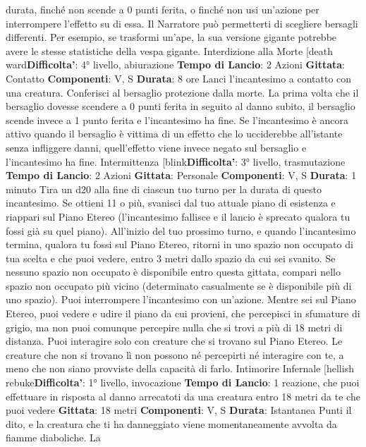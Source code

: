 \begin{multicols}{2}
durata, finché non scende a 0 punti ferita, o finché non
usi un’azione per interrompere l’effetto su di essa.
Il Narratore può permetterti di scegliere bersagli differenti. Per
esempio, se trasformi un’ape, la sua versione gigante
potrebbe avere le stesse statistiche della vespa
gigante.
Interdizione alla Morte
[death ward\textbf{Difficolta'}:
4° livello, abiurazione
\textbf{Tempo di Lancio}: 2 Azioni
\textbf{Gittata}: Contatto
\textbf{Componenti}: V, S
\textbf{Durata}: 8 ore
Lanci l’incantesimo a contatto con una creatura.
Conferisci al bersaglio protezione dalla morte.
La prima volta che il bersaglio dovesse scendere a 0
punti ferita in seguito al danno subito, il bersaglio
scende invece a 1 punto ferita e l’incantesimo ha fine.
Se l’incantesimo è ancora attivo quando il bersaglio è
vittima di un effetto che lo ucciderebbe all’istante senza
infliggere danni, quell’effetto viene invece negato sul
bersaglio e l’incantesimo ha fine.
Intermittenza
[blink\textbf{Difficolta'}:
3° livello, trasmutazione
\textbf{Tempo di Lancio}: 2 Azioni
\textbf{Gittata}: Personale
\textbf{Componenti}: V, S
\textbf{Durata}: 1 minuto
Tira un d20 alla fine di ciascun tuo turno per la durata di
questo incantesimo. Se ottieni 11 o più, svanisci dal tuo
attuale piano di esistenza e riappari sul Piano Etereo
(l’incantesimo fallisce e il lancio è sprecato qualora tu
fossi già su quel piano). All’inizio del tuo prossimo
turno, e quando l’incantesimo termina, qualora tu fossi
sul Piano Etereo, ritorni in uno spazio non occupato di
tua scelta e che puoi vedere, entro 3 metri dallo spazio
da cui sei svanito. Se nessuno spazio non occupato è
disponibile entro questa gittata, compari nello spazio
non occupato più vicino (determinato casualmente se è
disponibile più di uno spazio). Puoi interrompere
l’incantesimo con un’azione.
Mentre sei sul Piano Etereo, puoi vedere e udire il
piano da cui provieni, che percepisci in sfumature di
grigio, ma non puoi comunque percepire nulla che si
trovi a più di 18 metri di distanza. Puoi interagire solo
con creature che si trovano sul Piano Etereo. Le
creature che non si trovano lì non possono né percepirti
né interagire con te, a meno che non siano provviste
della capacità di farlo.
Intimorire Infernale
[hellish rebuke\textbf{Difficolta'}:
1° livello, invocazione
\textbf{Tempo di Lancio}: 1 reazione, che puoi effettuare in
risposta al danno arrecatoti da una creatura entro 18
metri da te che puoi vedere
\textbf{Gittata}: 18 metri
\textbf{Componenti}: V, S
\textbf{Durata}: Istantanea
Punti il dito, e la creatura che ti ha danneggiato viene
momentaneamente avvolta da fiamme diaboliche. La

\end{multicols}
